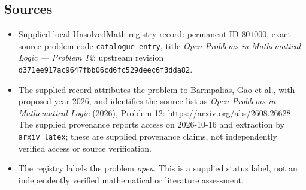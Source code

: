 \documentclass[11pt]{article}
\begin{document}
\subsection{Sources}
\begin{itemize}
\item Supplied local UnsolvedMath registry record: permanent ID \(801000\), exact source problem code \texttt{catalogue entry}, title \emph{Open Problems in Mathematical Logic --- Problem 12}; upstream revision \texttt{d371ee917ac9647fbb06cd6fc529deec6f3dda82}.
\item The supplied record attributes the problem to Barmpalias, Gao et al., with proposed year 2026, and identifies the source list as \emph{Open Problems in Mathematical Logic} (2026), Problem 12: \url{https://arxiv.org/abs/2608.26628}. The supplied provenance reports access on 2026-10-16 and extraction by \texttt{arxiv\_latex}; these are supplied provenance claims, not independently verified access or source verification.
\item The registry labels the problem \emph{open}. This is a supplied status label, not an independently verified mathematical or literature assessment.
\end{itemize}
\end{document}

